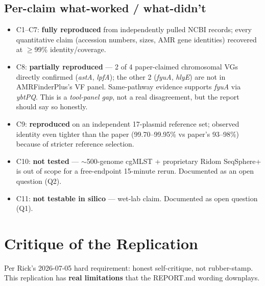 \documentclass[11pt]{article}
\begin{document}
\subsection{Per-claim what-worked / what-didn't}
\begin{itemize}
  \item C1--C7: \textbf{fully reproduced} from independently pulled NCBI records; every quantitative claim (accession numbers, sizes, AMR gene identities) recovered at $\geq$99\% identity/coverage.
  \item C8: \textbf{partially reproduced} --- 2 of 4 paper-claimed chromosomal VGs directly confirmed (\emph{astA}, \emph{lpfA}); the other 2 (\emph{fyuA}, \emph{hlyE}) are not in AMRFinderPlus's VF panel. Same-pathway evidence supports \emph{fyuA} via \emph{ybtPQ}. This is a \emph{tool-panel gap}, not a real disagreement, but the report should say so honestly.
  \item C9: \textbf{reproduced} on an independent 17-plasmid reference set; observed identity even tighter than the paper (99.70--99.95\% vs paper's 93--98\%) because of stricter reference selection.
  \item C10: \textbf{not tested} --- $\sim$500-genome cgMLST + proprietary Ridom SeqSphere+ is out of scope for a free-endpoint 15-minute rerun. Documented as an open question (Q2).
  \item C11: \textbf{not testable in silico} --- wet-lab claim. Documented as open question (Q1).
\end{itemize}

\section{Critique of the Replication}
\label{sec:critique}

Per Rick's 2026-07-05 hard requirement: honest self-critique, not rubber-stamp.
This replication has \textbf{real limitations} that the REPORT.md wording downplays.
\end{document}
